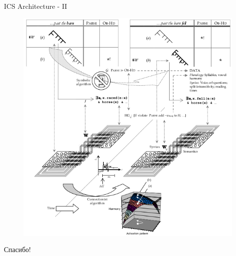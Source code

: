 \documentclass{beamer}
\begin{document}
\begin{frame}{ICS Architecture - II}
\begin{center}
	\begin{figure}[H]
		\includegraphics[scale=0.33]{ics2.png} 
	\end{figure}
\end{center}
\end{frame}

\begin{frame}{}
    \thispagestyle{empty}
    \begin{center}
        {\large Спасибо!}
    \end{center}
\end{frame}
\end{document}
